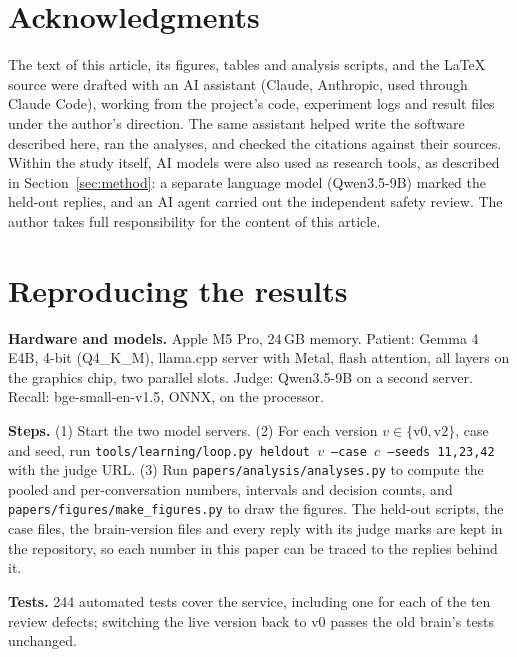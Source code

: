 \documentclass[twoside,11pt]{article}
\begin{document}
\section*{Acknowledgments}
The text of this article, its figures, tables and analysis scripts, and the \LaTeX{} source were
drafted with an AI assistant (Claude, Anthropic, used through Claude Code), working from the project's code, experiment logs and result
files under the author's direction. The same assistant helped write the software described here, ran the analyses, and checked the
citations against their sources. Within the study itself, AI models were also used as research tools, as described in Section~\ref{sec:method}: a separate language model (Qwen3.5-9B) marked the held-out replies, and an AI agent carried out the independent safety review. The author takes full responsibility for the content of this article.


\appendix
\section{Reproducing the results}
\textbf{Hardware and models.} Apple M5 Pro, 24\,GB memory. Patient: Gemma 4 E4B, 4-bit (Q4\_K\_M), llama.cpp server with Metal, flash
attention, all layers on the graphics chip, two parallel slots. Judge: Qwen3.5-9B on a second server. Recall: bge-small-en-v1.5, ONNX, on the
processor.

\textbf{Steps.} (1) Start the two model servers. (2) For each version $v\in\{\text{v0},\text{v2}\}$, case and seed, run
\texttt{tools/learning/loop.py heldout $v$ --case $c$ --seeds 11,23,42} with the judge URL. (3) Run \texttt{papers/analysis/analyses.py} to
compute the pooled and per-conversation numbers, intervals and decision counts, and \texttt{papers/figures/make\_figures.py} to draw the
figures. The held-out scripts, the case files, the brain-version files and every reply with its judge marks are kept in the repository, so
each number in this paper can be traced to the replies behind it.

\textbf{Tests.} 244 automated tests cover the service, including one for each of the ten review defects; switching the live version back to v0
passes the old brain's tests unchanged.
\end{document}

